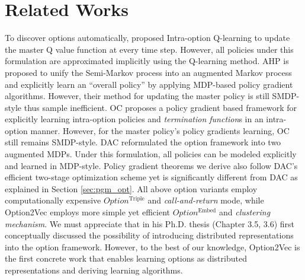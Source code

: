 \documentclass[10pt,journal,compsoc]{IEEEtran}
\renewcommand{\citename}{\citet}
\renewcommand{\cite}{\citep}
\begin{document}
\section{Related Works}
\label{sec:review}
To discover options automatically, \citename{sutton1999between}
proposed Intra-option Q-learning to update the master Q value
function at every time step. However, all policies under this
formulation are approximated implicitly using the Q-learning
method. AHP \cite{levy2011unified} is proposed to unify the
Semi-Markov process into an augmented Markov process and
explicitly learn an ``overall policy'' by applying MDP-based
policy gradient algorithms. However, their method for updating
the master policy is still SMDP-style thus sample inefficient. OC
\cite{bacon2017option} proposes a policy gradient based framework
for explicitly learning intra-option policies and
\emph{termination function}s in an intra-option manner. However,
for the master policy's policy gradients learning, OC still
remains SMDP-style. DAC \cite{zhang2019dac} reformulated the
option framework into two augmented MDPs. Under this formulation, all policies can be modeled explicitly and learned in MDP-style. Policy gradient theorems we derive also follow DAC's efficient
two-stage optimization scheme yet is significantly different
from DAC as explained in Section \ref{sec:pgm_opt}. All above
option variants employ computationally expensive
$Option^{\textrm{Triple}}$ and \emph{call-and-return} mode, while
Option2Vec employs more simple yet efficient
$Option^{\textrm{Embed}}$ and \emph{clustering mechanism}. We
must appreciate that \citename{bacon2018temporal} in his Ph.D.
thesis (Chapter 3.5, 3.6) first conceptually discussed the
possibility of introducing distributed representations into the
option framework. However, to the best of our knowledge,
Option2Vec is the first concrete work that enables learning
options as distributed representations and deriving learning
algorithms.

\end{document}

